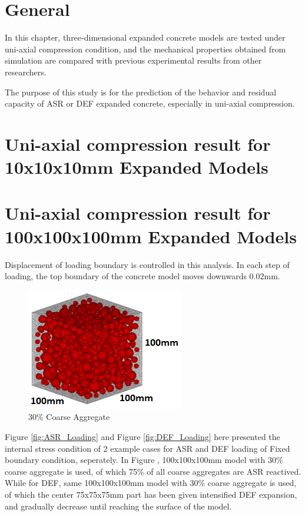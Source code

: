 

\section{General}

In this chapter, three-dimensional expanded concrete models are tested under uni-axial compression condition, and the mechanical properties obtained from simulation are compared with previous experimental results from other researchers.

The purpose of this study is for the prediction of the behavior and residual capacity of ASR or DEF expanded concrete, especially in uni-axial compression.


\clearpage
\section{Uni-axial compression result for 10x10x10mm Expanded Models}


\clearpage


\clearpage

\section{Uni-axial compression result for 100x100x100mm Expanded Models}

Displacement of loading boundary is controlled in this analysis. In each step of loading, the top boundary of the concrete model moves downwards 0.02mm.

\begin{figure}[ht!]
\centering
\includegraphics[width=.3\linewidth]{Files/Aggregate/A30.png}
  \caption{30\% Coarse Aggregate}
  \label{fig:A30_model}
\end{figure}

Figure \ref{fig:ASR_Loading} and Figure \ref{fig:DEF_Loading} here presented the internal stress condition of 2 example cases for ASR and DEF loading of Fixed boundary condition, seperately. In Figure , 100x100x100mm model with 30\% coarse aggregate is used, of which 75\% of all coarse aggregates are ASR reactived. While for DEF, same 100x100x100mm model with 30\% coarse aggregate is used, of which the center 75x75x75mm part has been given intensified DEF expansion, and gradually decrease until reaching the surface of the model.


